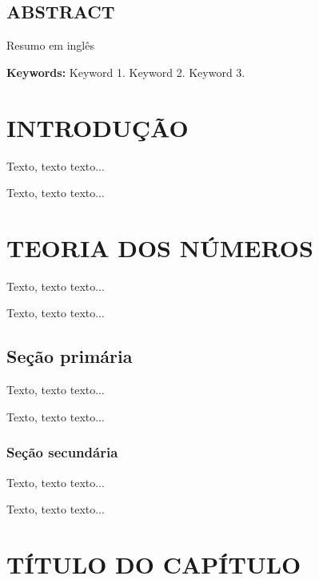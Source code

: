 \documentclass[12pt, a4paper]{report}
\theoremstyle{remark}
\theoremstyle{definition}
\theoremstyle{definition}
\theoremstyle{plain}
\theoremstyle{plain}
\theoremstyle{plain}
\theoremstyle{definition}
\begin{document}
\thispagestyle{empty}
\section*{\normalsize \centering \textbf{ABSTRACT}}

\noindent Resumo em inglês

\vspace*{0.5cm}

\noindent\textbf{Keywords:} Keyword 1. Keyword 2. Keyword 3.
\newpage


\tableofcontents \thispagestyle{empty} 


\chapter{INTRODUÇÃO}
\thispagestyle{myheadings}

Texto, texto texto...

Texto, texto texto...


\chapter{TEORIA DOS NÚMEROS}
\thispagestyle{myheadings}

Texto, texto texto...

Texto, texto texto...

\section{Seção primária}

Texto, texto texto...

Texto, texto texto...

\subsection{Seção secundária}

Texto, texto texto...

Texto, texto texto...


\chapter{TÍTULO DO CAPÍTULO}
\thispagestyle{myheadings}
\end{document}
